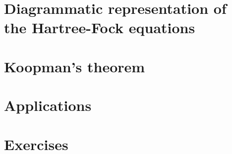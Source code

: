 \section{Diagrammatic representation of the Hartree-Fock equations}

\section{Koopman's theorem}

\section{Applications}

\section{Exercises}


